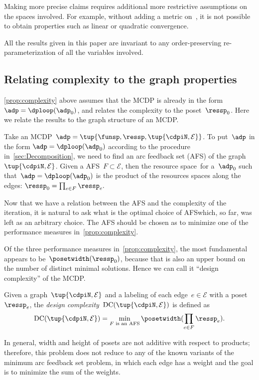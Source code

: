 \begin{remark}
    Making more precise claims requires additional more restrictive assumptions
    on the spaces involved. For example, without adding a metric on~\ressp,
    it is not possible to obtain properties such as linear or quadratic
    convergence.
\end{remark}

\begin{remark}
    All the results given in this paper are invariant to any order-preserving
    re-parameterization of all the variables involved.
\end{remark}

\subsection{Relating complexity to the graph properties}

\cref{prop:complexity} above assumes that the MCDP is already in the form $\adp=\dploop(\adp_{0})$, and relates the complexity to
the poset~$\ressp_{0}$.
Here we relate the results to the graph structure of an MCDP.

Take an MCDP~$\adp=\tup{ \funsp,\ressp,\tup{ \cdpiN,\mathcal{E}} } $.
To put~$\adp$ in the form $\adp=\dploop(\adp_{0})$ according
to the procedure in~\cref{sec:Decomposition}, we need to find an arc
feedback set (AFS) of the graph~$\tup{ \cdpiN,\mathcal{E}} $.
Given a AFS~$F\subset\mathcal{E}$, then the resource space~\ressp for a~$\adp_{0}$ such that~$\adp=\dploop(\adp_{0})$ is the product of the resources spaces along the edges: $\ressp_{0}=\prod_{e\in F}\ressp_{e}.$

Now that we have a relation between the AFS and the complexity of the iteration, it is natural to ask what is the optimal choice of AFS\textemdash which, so far, was left as an arbitrary choice.
The AFS should be chosen as to minimize one of the performance measures in~\cref{prop:complexity}.

Of the three performance measures in~\cref{prop:complexity}, the most fundamental appears to be~$\posetwidth(\ressp_{0})$, because that is also an upper bound on the number of distinct minimal solutions.
Hence we can call it ``design complexity'' of the MCDP.
\begin{definition}
    \label{def:design-complexity}Given a graph~$\tup{ \cdpiN,\mathcal{E}} $
    and a labeling of each edge~$e\in\mathcal{E}$ with a poset~$\ressp_{e}$,
    the \emph{design complexity~}$\text{DC}(\tup{ \cdpiN,\mathcal{E}} )$
    is defined as
    \begin{equation}
        \text{DC}(\tup{ \cdpiN,\mathcal{E}} )=\min_{F\text{ is an AFS}}\posetwidth(\prod_{e\in F}\ressp_{e}).\label{eq:complexity}
    \end{equation}
\end{definition}
In general, width and height of posets are not additive with respect
to products; therefore, this problem does not reduce to any of the
known variants of the minimum arc feedback set problem, in which
each edge has a weight and the goal is to minimize the sum of the
weights.

